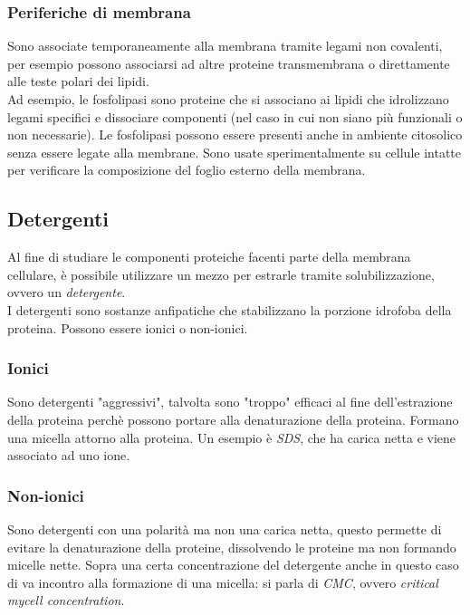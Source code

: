         \subsubsection{Periferiche di membrana}
            Sono associate temporaneamente alla membrana tramite legami non covalenti, per esempio possono associarsi ad altre proteine transmembrana o direttamente alle teste polari dei lipidi. \\
            Ad esempio, le fosfolipasi sono proteine che si associano ai lipidi che idrolizzano legami specifici e dissociare componenti (nel caso in cui non siano più funzionali o non necessarie). 
            Le fosfolipasi possono essere presenti anche in ambiente citosolico senza essere legate alla membrane. Sono usate sperimentalmente su cellule intatte per verificare la composizione del foglio esterno della membrana.
            
    \subsection{Detergenti}
        Al fine di studiare le componenti proteiche facenti parte della membrana cellulare, è possibile utilizzare un mezzo per estrarle tramite solubilizzazione, ovvero un \textit{detergente}.\\ 
        I detergenti sono sostanze anfipatiche che stabilizzano la porzione idrofoba della proteina. Possono essere ionici o non-ionici.
        \subsubsection{Ionici}
            Sono detergenti "aggressivi", talvolta sono "troppo" efficaci al fine dell'estrazione della proteina perchè possono portare alla denaturazione della proteina. Formano una micella attorno alla proteina. Un esempio è \textit{SDS}, che ha carica netta e viene associato ad uno ione.
        \subsubsection{Non-ionici}
            Sono detergenti con una polarità ma non una carica netta, questo permette di evitare la denaturazione della proteine, dissolvendo le proteine ma non formando micelle nette. 
            Sopra una certa concentrazione del detergente anche in questo caso di va incontro alla formazione di una micella: si parla di \textit{CMC}, ovvero \textit{critical mycell concentration}.
        
